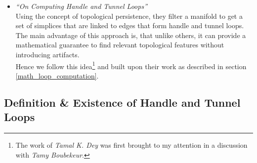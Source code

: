 \begin{itemize}
	\item \citep[][]{Dey2007} \textit{``On Computing Handle and Tunnel Loops''}\\
Using the concept of topological persistence, they filter a manifold to get a set of simplices that are linked to edges that form handle and tunnel loops.
The main advantage of this approach is, that unlike others, it can provide a mathematical guarantee to find relevant topological features without introducing artifacts.\\
Hence we follow this idea\footnote{ The work of \textit{Tamal K. Dey} was first brought to my attention in a discussion with \textit{Tamy Boubekeur}.} and built upon their work as described in section \ref{math_loop_computation}.
\end{itemize}

\subsection{Definition \& Existence of Handle and Tunnel Loops}
\label{math_loop_definition}

